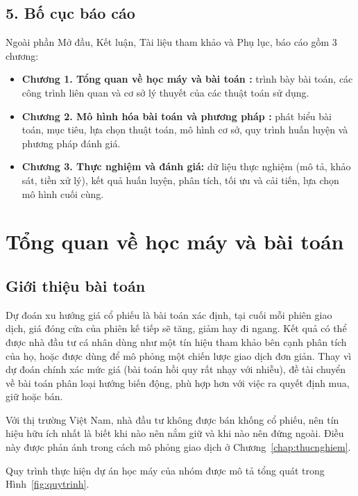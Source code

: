 \documentclass[12pt,a4paper,oneside]{report}
\begin{document}
\section*{5. Bố cục báo cáo}
Ngoài phần Mở đầu, Kết luận, Tài liệu tham khảo và Phụ lục, báo cáo gồm
3 chương:
\begin{itemize}
  \item \textbf{Chương 1. Tổng quan về học máy và bài toán \tenbaitoan:} trình bày bài toán,
        các công trình liên quan và cơ sở lý thuyết của các thuật toán sử dụng.
  \item \textbf{Chương 2. Mô hình hóa bài toán và phương pháp \tenbaitoan:} phát biểu bài
        toán, mục tiêu, lựa chọn thuật toán, mô hình cơ sở, quy trình huấn
        luyện và phương pháp đánh giá.
  \item \textbf{Chương 3. Thực nghiệm và đánh giá:} dữ liệu thực nghiệm (mô
        tả, khảo sát, tiền xử lý), kết quả huấn luyện, phân tích, tối ưu và
        cải tiến, lựa chọn mô hình cuối cùng.
\end{itemize}

\chapter{Tổng quan về học máy và bài toán \tenbaitoan}
\label{chap:tongquan}

\section{Giới thiệu bài toán}
Dự đoán xu hướng giá cổ phiếu là bài toán xác định, tại cuối mỗi phiên giao
dịch, giá đóng cửa của phiên kế tiếp sẽ tăng, giảm hay đi ngang. Kết quả có
thể được nhà đầu tư cá nhân dùng như một tín hiệu tham khảo bên cạnh phân
tích của họ, hoặc được dùng để mô phỏng một chiến lược giao dịch đơn giản.
Thay vì dự đoán chính xác mức giá (bài toán hồi quy rất nhạy với nhiễu), đề
tài chuyển về bài toán phân loại hướng biến động, phù hợp hơn với việc ra
quyết định mua, giữ hoặc bán.

Với thị trường Việt Nam, nhà đầu tư không được bán khống cổ phiếu, nên tín
hiệu hữu ích nhất là biết khi nào nên nắm giữ và khi nào nên đứng ngoài. Điều
này được phản ánh trong cách mô phỏng giao dịch ở Chương~\ref{chap:thucnghiem}.

Quy trình thực hiện dự án học máy của nhóm được mô tả tổng quát trong
Hình~\ref{fig:quytrinh}.
\end{document}
